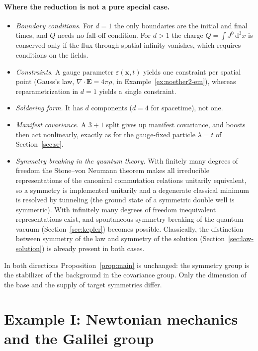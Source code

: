 \documentclass[11pt,a4paper,openany]{book}
\theoremstyle{definition}
\theoremstyle{plain}
\theoremstyle{remark}
\newcommand{\dd}{\mathrm{d}}
\newcommand{\eps}{\varepsilon}
\newcommand{\vx}{\bm{x}}
\newcommand{\vE}{\bm{E}}
\begin{document}
\paragraph{Where the reduction is not a pure special case.}
\begin{itemize}[leftmargin=1.6em,itemsep=2pt]
\item \emph{Boundary conditions.} For $d=1$ the only boundaries are the initial
  and final times, and $Q$ needs no fall-off condition. For $d>1$ the charge
  $Q=\int J^0\,\dd^3x$ is conserved only if the flux through spatial infinity
  vanishes, which requires conditions on the fields.
\item \emph{Constraints.} A gauge parameter $\eps(\vx,t)$ yields one constraint
  per spatial point (Gauss's law, $\nabla\!\cdot\vE=4\pi\rho$, in
  Example~\ref{ex:noether2-em}), whereas reparametrization in $d=1$ yields a
  single constraint.
\item \emph{Soldering form.} It has $d$ components ($d=4$ for spacetime), not one.
\item \emph{Manifest covariance.} A $3{+}1$ split gives up manifest covariance,
  and boosts then act nonlinearly, exactly as for the gauge-fixed particle
  $\lambda=t$ of Section~\ref{sec:sr}.
\item \emph{Symmetry breaking in the quantum theory.} With finitely many
  degrees of freedom the Stone--von Neumann theorem makes all irreducible
  representations of the canonical commutation relations unitarily
  equivalent, so a symmetry is implemented unitarily and a degenerate classical
  minimum is resolved by tunneling (the ground state of a symmetric double well
  is symmetric). With infinitely many degrees of freedom inequivalent
  representations exist, and spontaneous symmetry breaking of the quantum
  vacuum (Section~\ref{sec:kepler}) becomes possible. Classically, the
  distinction between symmetry of the law and symmetry of the solution
  (Section~\ref{sec:law-solution}) is already present in both cases.
\end{itemize}
In both directions Proposition~\ref{prop:main} is unchanged: the symmetry group
is the stabilizer of the background in the covariance group. Only the
dimension of the base and the supply of target symmetries differ.

\section{Example I: Newtonian mechanics and the Galilei group}
\label{sec:galilei}
\end{document}
